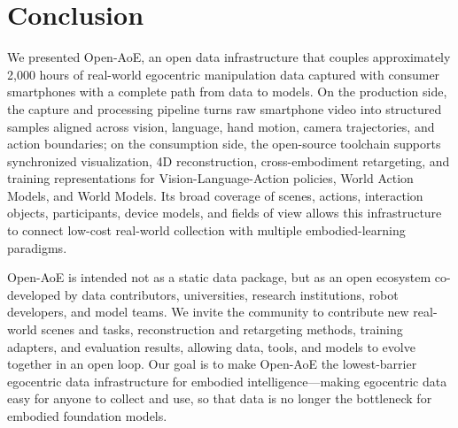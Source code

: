 \section{Conclusion}

We presented Open-AoE, an open data infrastructure that couples approximately 2,000 hours of real-world egocentric manipulation data captured with consumer smartphones with a complete path from data to models.
On the production side, the capture and processing pipeline turns raw smartphone video into structured samples aligned across vision, language, hand motion, camera trajectories, and action boundaries; on the consumption side, the open-source toolchain supports synchronized visualization, 4D reconstruction, cross-embodiment retargeting, and training representations for Vision-Language-Action policies, World Action Models, and World Models.
Its broad coverage of scenes, actions, interaction objects, participants, device models, and fields of view allows this infrastructure to connect low-cost real-world collection with multiple embodied-learning paradigms.

Open-AoE is intended not as a static data package, but as an open ecosystem co-developed by data contributors, universities, research institutions, robot developers, and model teams.
We invite the community to contribute new real-world scenes and tasks, reconstruction and retargeting methods, training adapters, and evaluation results, allowing data, tools, and models to evolve together in an open loop.
Our goal is to make Open-AoE the lowest-barrier egocentric data infrastructure for embodied intelligence---making egocentric data easy for anyone to collect and use, so that data is no longer the bottleneck for embodied foundation models.
